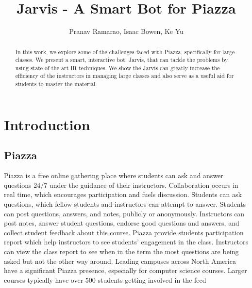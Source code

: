 \documentclass[sigconf]{acmart}
\begin{document}
\title{Jarvis - A Smart Bot for Piazza}
\author{Pranav Ramarao, Isaac Bowen, Ke Yu}


\renewcommand{\shortauthors}{Ramarao, Bowen, Yu}


\begin{abstract}
In this work, we explore some of the challenges faced with Piazza, specifically for large classes. We present a smart, interactive bot, Jarvis, that can tackle the problems by using state-of-the-art IR techniques. We show the Jarvis can greatly increase the efficiency of the instructors in managing large classes and also serve as a useful aid for students to master the material.
\end{abstract}


\maketitle
\section{Introduction}

\subsection{Piazza}
Piazza is a free online gathering place where students can ask and answer questions 24/7 under the guidance of their instructors. Collaboration occurs in real time, which encourages participation and fuels discussion. Students can ask questions, which fellow students and instructors can attempt to answer. Students can post questions, answers, and notes, publicly or anonymously. Instructors can post notes, answer student questions, endorse good questions and answers, and collect student feedback about this course. Piazza provide students participation report which help instructors to see students’ engagement in the class. Instructors can view the class report to see when in the term the most questions are being asked but not the other way around. Leading campuses across North America have a significant Piazza presence, especially for computer science courses. Larger courses typically have over 500 students getting involved in the feed
\end{document}
